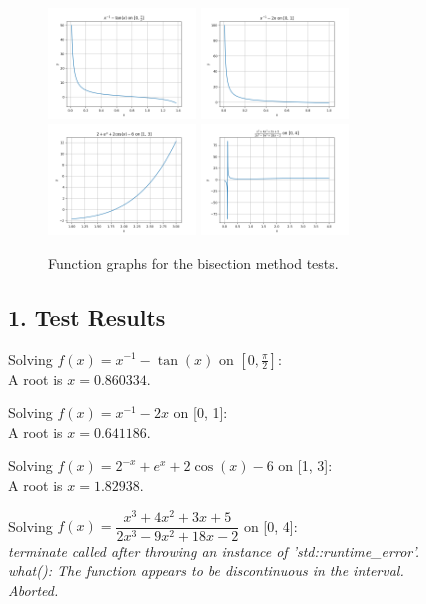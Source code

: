 \documentclass[a4paper]{article}
\begin{document}
\begin{figure}[h!]
  \centering
  \includegraphics[width=0.35\textwidth]{./figures/B1.png}
  \includegraphics[width=0.35\textwidth]{./figures/B2.png}
  \includegraphics[width=0.35\textwidth]{./figures/B3.png}
  \includegraphics[width=0.35\textwidth]{./figures/B4.png}
  \caption{Function graphs for the bisection method tests.}
  \label{fig:1}
\end{figure}

\subsection*{1. Test Results}

\begin{tcolorbox}[title=Output Results, colback=white, colframe=black]
  Solving \(f(x) = x^{-1} - \tan(x)\) on \([0, \frac{\pi}{2}]\): \\
  A root is \(x = 0.860334\).
  
  Solving \(f(x) = x^{-1} - 2x\) on [0, 1]: \\
  A root is \(x = 0.641186\).
  
  Solving \(f(x) = 2^{-x} + e^x + 2\cos(x) - 6\) on [1, 3]: \\
  A root is \(x = 1.82938\).
  
  Solving \(f(x) = \dfrac{x^3 + 4x^2 + 3x + 5}{2x^3 - 9x^2 + 18x - 2}\) on [0, 4]: \\
  \textit{terminate called after throwing an instance of 'std::runtime\_error'. \\what(): The function appears to be discontinuous in the interval. \\Aborted.}
\end{tcolorbox}
\end{document}
